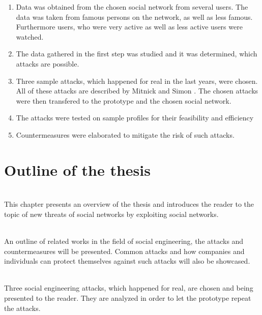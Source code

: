 \begin{enumerate}

\item Data was obtained from the chosen social network from several users. The
data was taken from famous persons on the network, as well as less famous.
Furthermore users, who were very active as well as less active users were
watched.

\item The data gathered in the first step was studied and it was determined,
which attacks are possible. 

\item Three sample attacks, which happened for real in the last years, were
chosen. All of these attacks are described by Mitnick and Simon
\cite{mitnick2003}. The chosen attacks were then transfered to the prototype
and the chosen social network.

\item The attacks were tested on sample profiles for their feasibility and
efficiency

\item Countermeasures were elaborated to mitigate the risk of such attacks.

\end{enumerate}

\newpage
\section{Outline of the thesis}

\let\oldchapterautorefname \chapterautorefname
\def\chapterautorefname{Chapter}

\vspace{0.5em}\\
\noindent This chapter presents an overview of the thesis and introduces the
reader to the topic of new threats of social networks by exploiting social
networks.

\vspace{0.5em}\\
\noindent An outline of related works in the field of social
engineering, the attacks and countermeasures will be presented. Common attacks
and how companies and individuals can protect themselves against such attacks
will also be showcased.

\vspace{0.5em}\\
\noindent Three social engineering attacks, which happened for real, are chosen
and being presented to the reader. They are analyzed in order to let the
prototype repeat the attacks.

